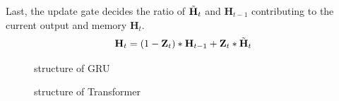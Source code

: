 \documentclass{article}
\begin{document}
\hspace{16}Last, the update gate decides the ratio of $\Tilde{\textbf{H}}_t$ and $\textbf{H}_{t-1}$ contributing to the current output and memory $\textbf{H}_t$.
\begin{equation*}
    \begin{aligned}
    \textbf{H}_t = (1 - \textbf{Z}_t) * \textbf{H}_{t-1} + \textbf{Z}_t * \Tilde{\textbf{H}}_t
    \end{aligned}
\end{equation*}

\begin{figure}[!htb]
   \begin{minipage}{0.48\textwidth}
    \caption{structure of GRU}
    \label{fig:gru}
   \end{minipage}\hfill
   \begin{minipage}{0.48\textwidth}
    \caption{structure of Transformer}
    \label{fig:transformer}
   \end{minipage}
\end{figure}
\end{document}
